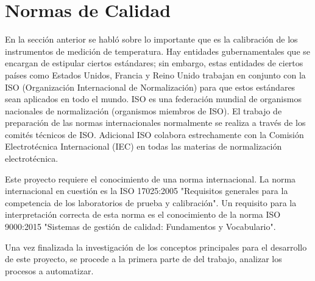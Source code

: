 \section{Normas de Calidad}

\par 
En la sección anterior se habló sobre lo importante que es la calibración de los instrumentos de medición de temperatura. Hay entidades gubernamentales que se encargan de estipular ciertos estándares; sin embargo, estas entidades de ciertos países como Estados Unidos, Francia y Reino Unido trabajan en conjunto con la ISO (Organización Internacional de Normalización) para que estos estándares sean aplicados en todo el mundo. ISO es una federación mundial de organismos nacionales de normalización (organismos miembros de ISO). El trabajo de preparación de las normas internacionales normalmente se realiza a través de los comités técnicos de ISO. Adicional ISO colabora estrechamente con la Comisión Electrotécnica Internacional (IEC) en todas las materias de normalización electrotécnica.

\par \noindent
Este proyecto requiere el conocimiento de una norma internacional. La norma internacional en cuestión es la ISO 17025:2005 "Requisitos generales para la competencia de los laboratorios de prueba y calibración". Un requisito para la interpretación correcta de esta norma es el conocimiento de la norma ISO 9000:2015 "Sistemas de gestión de calidad: Fundamentos y Vocabulario". 





\par \noindent
Una vez finalizada la investigación de los conceptos principales para el desarrollo de este proyecto, se procede a la primera parte de del trabajo, analizar los procesos a automatizar.


